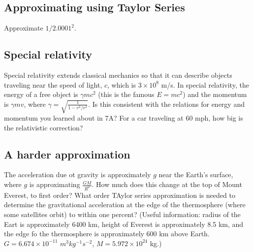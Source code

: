\documentclass{article}
\begin{document}
\subsection{Approximating using Taylor Series}

Approximate $1/2.0001^2$.

\subsection{Special relativity}

Special relativity extends classical mechanics so that it can describe objects traveling near the speed of light, $c$, which is $3\times10^8$ m/s. In special relativity, the energy of a free object is $\gamma mc^2$ (this is the famous $E=mc^2$) and the momentum is $\gamma mv$, where $\gamma = \sqrt{\frac{1}{1-v^2/c^2}}$. Is this consistent with the relations for energy and momentum you learned about in 7A? For a car traveling at 60 mph, how big is the relativistic correction?

\subsection{A harder approximation}

The acceleration due ot gravity is approximately $g$ near the Earth's surface, where $g$ is approximating $\frac{GM}{R^2}$. How much does this change at the top of Mount Everest, to first order? What order TAylor series approximation is needed to determine the gravitational acceleration at the edge of the thermosphere (where some satellites orbit) to within one percent? (Useful information: radius of the Eart is approximately 6400 km, height of Everest is approximately 8.5 km, and the edge fo the thermosphere is approximately 600 km above Earth. $G=6.674\times10^{-11}$ $m^3 kg^{-1} s^{-2}$, $M=5.972\times10^{24}$ kg.)
\end{document}
